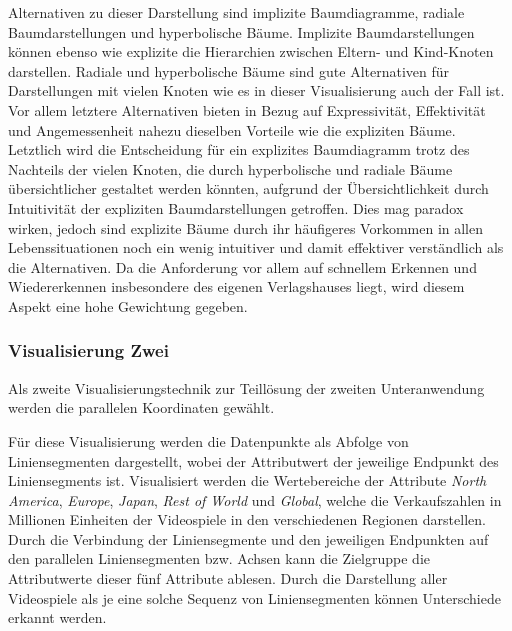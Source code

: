 \documentclass[usegeometry=true]{scrartcl}
\begin{document}
Alternativen zu dieser Darstellung sind implizite Baumdiagramme, radiale Baumdarstellungen und hyperbolische Bäume. 
Implizite Baumdarstellungen können ebenso wie explizite die Hierarchien zwischen Eltern- und Kind-Knoten darstellen. 
Radiale und hyperbolische Bäume sind gute Alternativen für Darstellungen mit vielen Knoten wie es in dieser Visualisierung auch der Fall ist. 
Vor allem letztere Alternativen bieten in Bezug auf Expressivität, Effektivität und Angemessenheit nahezu dieselben Vorteile wie die expliziten Bäume. 
Letztlich wird die Entscheidung für ein explizites Baumdiagramm trotz des Nachteils der vielen Knoten, die durch hyperbolische und radiale Bäume übersichtlicher gestaltet werden könnten, aufgrund der Übersichtlichkeit durch Intuitivität der expliziten Baumdarstellungen getroffen. 
Dies mag paradox wirken, jedoch sind explizite Bäume durch ihr häufigeres Vorkommen in allen Lebenssituationen noch ein wenig intuitiver und damit effektiver verständlich als die Alternativen. 
Da die Anforderung vor allem auf schnellem Erkennen und Wiedererkennen insbesondere des eigenen Verlagshauses liegt, wird diesem Aspekt eine hohe Gewichtung gegeben.

\subsubsection{Visualisierung Zwei}
Als zweite Visualisierungstechnik zur Teillösung der zweiten Unteranwendung werden die parallelen Koordinaten gewählt.

Für diese Visualisierung werden die Datenpunkte als Abfolge von Liniensegmenten dargestellt, wobei der Attributwert der jeweilige Endpunkt des Liniensegments ist. 
Visualisiert werden die Wertebereiche der Attribute \textit{North America}, \textit{Europe}, \textit{Japan}, \textit{Rest of World} und \textit{Global}, welche die Verkaufszahlen in Millionen Einheiten der Videospiele in den verschiedenen Regionen darstellen.
Durch die Verbindung der Liniensegmente und den jeweiligen Endpunkten auf den parallelen Liniensegmenten bzw. Achsen kann die Zielgruppe die Attributwerte dieser fünf Attribute ablesen. 
Durch die Darstellung aller Videospiele als je eine solche Sequenz von Liniensegmenten können Unterschiede erkannt werden. 
\end{document}
